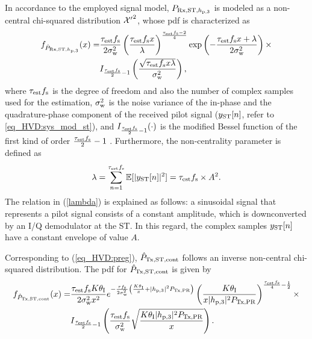 In accordance to the employed signal model, $P_{\text{Rx,ST,$h_{\text{p,3}}$}}$ is modeled as a non-central chi-squared distribution $\ncchi2$, whose pdf is characterized as \cite{Char99}
\begin{align}
	\label{eq_HVD:dprcvdstpr}
	f_{\hat{P}_{\text{Rx,ST,$h_{\text{p,3}}$}}} (x) =& 
	\frac{\tau_{\text{est}} f_{\text{s}}}{2\sigma^2_{\text{w}}} \left(\frac{\tau_{\text{est}} f_{\text{s}} x}{\lambda}\right)^\frac{\tau_{\text{est}} f_{\text{s}}-2}{4} \exp\left(-\frac{\tau_{\text{est}} f_{\text{s}} x+\lambda}{2\sigma^2_{\text{w}}}\right)  \times \\ 
	\quad & I_{ \frac{\tau_{\text{est}} f_{\text{s}}}{2}-1 }\left(\frac{\sqrt{\tau_{\text{est}} f_{\text{s}} x \lambda}}{\sigma^2_{\text{w}}}\right) \nonumber  ,
\end{align}
where $\tau_{\text{est}} f_{\text{s}}$ is the degree of freedom and also the number of complex samples used for the estimation, $\sigma^2_{\text{w}}$ is the noise variance of the in-phase and the quadrature-phase component of the received pilot signal ($y_{\text{ST}}[n]$, refer to \ref{eq_HVD:sys_mod_st}), and $I_{\frac{\tau_{\text{est}} f_{\text{s}}}{2}-1}(\cdot)$ is the modified Bessel function of the first kind of order $\frac{\tau_{\text{est}} f_{\text{s}}}{2}-1$ \cite{Jef00}. Furthermore, the non-centrality parameter is defined as
\begin{equation}
	\label{lambda}
	\lambda = \sum_{n=1}^{\tau_{\text{est}} f_{\text{s}}} \mathbb{E}[|y_{\text{ST}}[n]|^2] = \tau_{\text{est}} f_{\text{s}} \times A^2.
\end{equation}
The relation in (\ref{lambda}) is explained as follows: a sinusoidal signal that represents a pilot signal consists of a constant amplitude, which is downconverted by an I/Q demodulator at the ST. In this regard, the complex samples $y_{\text{ST}}[n]$ have a constant envelope of value $A$. 

Corresponding to (\ref{eq_HVD:preg}), $\hat{P}_{\text{Tx,ST,cont}}$ follows an inverse non-central chi-squared distribution. The pdf for $\hat{P}_{\text{Tx,ST,cont}}$  is given by
\begin{align}
f_{\hat{P}_{\text{Tx,ST,cont}}}(x) =& \frac{\tau_{\text{est}} f_{\text{s}} K \theta_{\text{I}}}{2\sigma^2_{\text{w}} x^2} e^{- \frac{\tau f_{\text{s}}}{2 \sigma^2_{\text{w}}}\left( \frac{K  \theta_{\text{I}}}{x} + |h_{\text{p,3}}|^2 P_{\text{Tx,PR}} \right)} \left( \frac{K \theta_{\text{I}}}{x |h_{\text{p,3}}|^2 P_{\text{Tx,PR}}}   \right)^{\frac{\tau_{\text{est}} f_{\text{s}}}{4} - \frac{1}{2}} \label{eq_HVD:dpreg} \times \\
\quad & I_{\frac{\tau_{\text{est}} f_{\text{s}}}{2}  - 1}\left( \frac{\tau_{\text{est}} f_{\text{s}}}{\sigma^2_{\text{w}}} \sqrt{\frac{ K \theta_{\text{I}} |h_{\text{p,3}}|^2 P_{\text{Tx,PR}}}{x}}  \right). \nonumber
\end{align}

